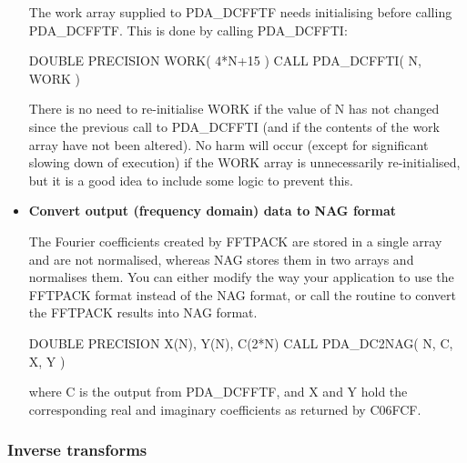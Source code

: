 \documentclass[11pt,twoside,nolof]{starlink}
\begin{document}
\begin{itemize}
   The work array supplied to PDA\_DCFFTF needs initialising before calling
   PDA\_DCFFTF. This is done by calling PDA\_DCFFTI:

\begin{terminalv}
      DOUBLE PRECISION WORK( 4*N+15 )
      CALL PDA_DCFFTI( N, WORK )
\end{terminalv}

   There is no need to re-initialise WORK if the value of N has not
   changed since the previous call to PDA\_DCFFTI (and if the contents of the
   work array have not been altered). No harm will occur (except for
   significant slowing down of execution) if the WORK array is
   unnecessarily re-initialised, but it is a good idea to include some
   logic to prevent this.

\item\textbf{Convert output (frequency domain) data to NAG format}

   The Fourier coefficients created by FFTPACK are stored in a single
   array and are not normalised, whereas NAG stores them in two arrays
   and normalises them. You can either modify the way your application
   to use the FFTPACK format instead of the NAG format, or call the
   routine to convert the FFTPACK results into NAG format.

\begin{terminalv}
      DOUBLE PRECISION X(N), Y(N), C(2*N)
      CALL PDA_DC2NAG( N, C, X, Y )
\end{terminalv}

   where C is the output from PDA\_DCFFTF, and X and Y hold the corresponding
   real and imaginary coefficients as returned by C06FCF.

   \end{itemize}


\subsubsection{Inverse transforms}
\end{document}

